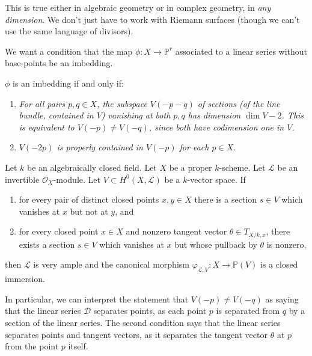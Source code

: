 \documentclass[12pt]{article}
\begin{document}
This is true either in algebraic geometry or in complex geometry, in \textit{any dimension}. We don't just have to work with Riemann surfaces (though we can't use the same language of divisors).

We want a condition that the map $\phi : X \to \mathbb{P}^r$ associated to a linear series without base-points be an imbedding.

\begin{proposition}
    $\phi$ is an imbedding if and only if: \begin{enumerate}
\item \textit{For all pairs $p, q \in X$, the subspace $V(-p - q)$ of sections (of the line bundle, contained in $V$) vanishing at both $p, q$ has dimension $\dim V - 2$. This is equivalent to $V(-p) \neq V(-q)$, since both have codimension one in $V$.}

\item \textit{$V(-2p)$ is properly contained in $V(-p)$ for each $p \in X$.}
\end{enumerate}
\end{proposition}

\begin{lemma} \label{lemma:separating-points-tangent}
    Let $k$ be an algebraically closed field. Let $X$ be a proper $k$-scheme. Let $\mathcal{L}$ be an invertible $\mathcal{O}_X$-module. Let $V \subset H^0(X, \mathcal{L})$ be a $k$-vector space. If
    \begin{enumerate}
    \item for every pair of distinct closed points $x,y \in X$ there is a section $s \in V$ which vanishes at $x$ but not at $y$, and
    \item for every closed point $x \in X$ and nonzero tangent vector $\theta \in T_{X/k,x}$, there exists a section $s \in V$ which vanishes at $x$ but whose pullback by $\theta$ is nonzero,
    \end{enumerate}
    then $\mathcal{L}$ is very ample and the canonical morphism $\varphi_{\mathcal{L},V} : X \to \mathbb{P}(V)$ is a closed immersion.
    \end{lemma}
In particular, we can interpret the statement that $V(-p) \neq V(-q)$ as saying that the linear series $\mathcal{D}$ separates points, as each point $p$ is separated from $q$ by a section of the linear series. The second condition says that the linear series separates points and tangent vectors, as it separates the tangent vector $\theta$ at $p$ from the point $p$ itself.
\end{document}
